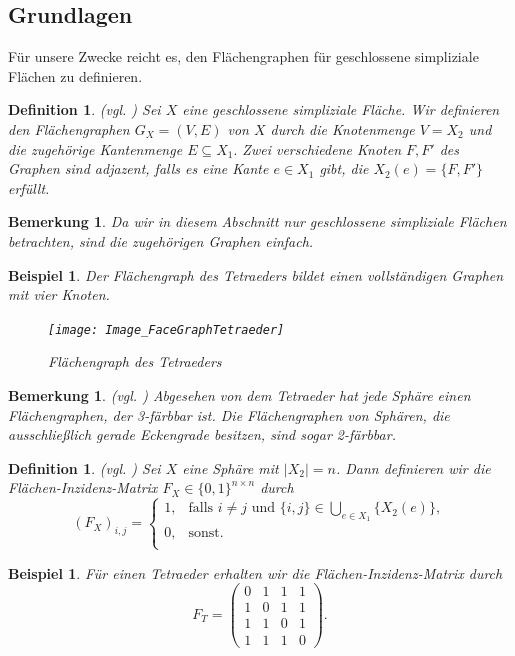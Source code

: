\documentclass[12pt,titlepage,twoside,cleardoublepage]{article}
\theoremstyle{nummermitklammern}
\newtheorem{bsp}[temp]{Beispiel}
\newtheorem{definition}[temp]{Definition}
\newtheorem{bemerkung}[temp]{Bemerkung}
\newtheorem{definition}[zahl]{Definition}
\newtheorem{bsp}[zahl]{Beispiel}
\newtheorem{bemerkung}[zahl]{Bemerkung}
\numberwithin{equation}{section}
\begin{document}
\subsection{Grundlagen}
Für unsere Zwecke reicht es, den Flächengraphen für geschlossene simpliziale Flächen zu definieren.
\begin{definition}{\textsc{(}vgl. \textsc{\cite{simp})}}
Sei $X$ eine geschlossene simpliziale Fläche. Wir definieren den \emph{Flächengraphen} $G_X=(V,E)$ von $X$ durch die Knotenmenge $V=X_2$ und die zugehörige Kantenmenge $E\subseteq X_1.$ Zwei verschiedene Knoten $F,F'$ des Graphen sind adjazent, falls es eine Kante $e\in X_1$ gibt, die $X_2(e)=\{F,F'\}$ erfüllt. 
\end{definition}
\begin{bemerkung}
Da wir in diesem Abschnitt nur geschlossene simpliziale Flächen betrachten, sind die zugehörigen Graphen einfach. 
\end{bemerkung}
\begin{bsp}
Der Flächengraph des Tetraeders bildet einen vollständigen Graphen mit vier Knoten.
\begin{figure}[H]
\begin{center}
\texttt{[image: Image\_FaceGraphTetraeder]}
\end{center}
\caption{Flächengraph des Tetraeders}
\end{figure}
\end{bsp}
\begin{bemerkung}{\textsc{(}vgl. \textsc{\cite{simp})}}
Abgesehen von dem Tetraeder hat jede Sphäre einen  Flächengraphen, der 3-färbbar ist. Die Flächengraphen von Sphären, die ausschließlich gerade Eckengrade besitzen, sind sogar 2-färbbar.
\end{bemerkung}
\begin{definition}{\textsc{(}vgl. \textsc{\cite{simp})}}
Sei $X$ eine Sphäre mit $\vert X_2\vert =n$. Dann definieren wir die \emph{Flächen-Inzidenz-Matrix} 
$F_X\in \{0,1\}^{n \times n}$ durch
\[
{(F_X)}_{i,j}=
\begin{cases}
1,& \text{falls $i\neq j$ und $\{i,j\}\in \bigcup_{e\in X_1} \{X_2(e)\},$} \\
0,&\text{sonst.}\\
\end{cases}
\]
\end{definition}
\begin{bsp}
Für einen Tetraeder erhalten wir die Flächen-Inzidenz-Matrix  durch  
\[
F_T=
\left( \begin{array}{rrrrrrrr}
0 & 1 & 1 & 1 \\ 
1 & 0 & 1 & 1 \\
1 & 1 & 0 & 1 \\
1 & 1 & 1 & 0  
\end{array}
\right).
\]

\end{bsp}
\end{document}
